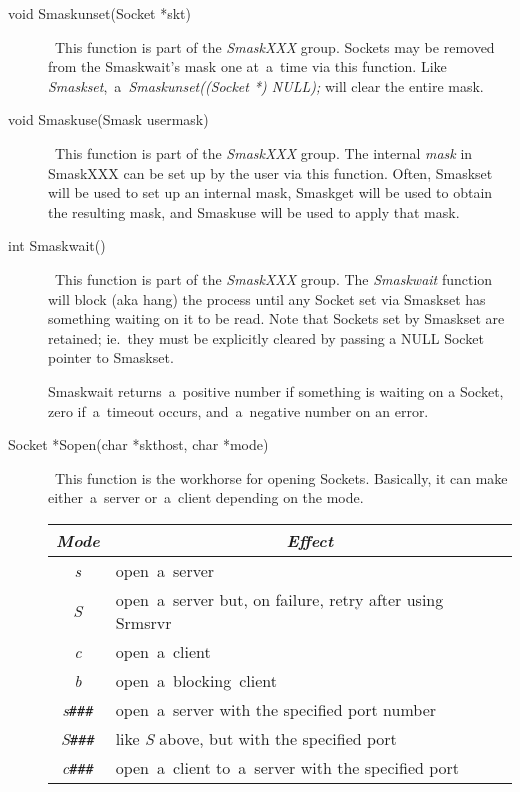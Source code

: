 \documentclass[12pt]{article}
\begin{document}
\begin{description}
\item[void Smaskunset(Socket *skt)] \     This function is part of the {\em Smask{\small XXX}} group.  Sockets may be
    removed from the Smaskwait's mask one at~a~time via this function.  Like
    {\em Smaskset},~a~{\em Smaskunset((Socket *) {\small NULL});} will clear
    the entire mask.

\item[void Smaskuse(Smask usermask)] \     This function is part of the {\em Smask{\small XXX}} group.  The internal
    {\em mask} in Smask{\small XXX} can be set up by the user via this
    function.  Often, Smaskset will be used to set up an internal mask,
    Smaskget will be used to obtain the resulting mask, and Smaskuse will
    be used to apply that mask.

\item[int Smaskwait()] \     This function is part of the {\em Smask{\small XXX}} group.  The {\em
    Smaskwait}  function will block (aka hang) the process until any Socket set
    via Smaskset has something waiting on it to be read.  Note that Sockets set
    by Smaskset are retained; ie.~they must be explicitly cleared by passing a
    {\small NULL} Socket pointer to Smaskset.

    Smaskwait returns~a~positive number if something is waiting on a
    Socket, zero if~a~timeout occurs, and~a~negative number on an error.

\item[Socket *Sopen(char *skthost, char *mode)] \     This function is the workhorse for opening Sockets.  Basically, it can make
    either~a~server or~a~client depending on the mode.

      \begin{center}
      \begin{tabular}{|cl|}
      \hline
       \multicolumn{1}{|c}{\em Mode}  &
       \multicolumn{1}{c|}{\em Effect}                                               \\
      \hline
        {\em s}           & open~a~server                                            \\
        {\em S}           & open~a~server but, on failure, retry after using Srmsrvr \\
        {\em c}           & open~a~client                                            \\
        {\em b}           & open~a~blocking~client                                   \\
        {\em s\verb`###`} & open~a~server with the specified port number             \\
        {\em S\verb`###`} & like {\em S} above, but with the specified port          \\
        {\em c\verb`###`} & open~a~client to~a~server with the specified port        \\
      \hline
      \end{tabular}
      \end{center}


\end{description}
\end{document}
